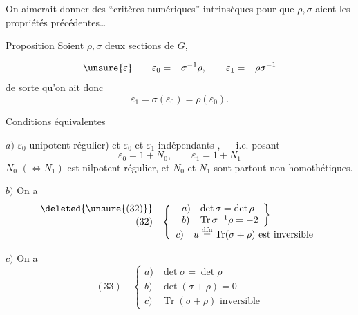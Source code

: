 On aimerait donner des ``critères numériques'' intrinsèques pour que $\rho,\sigma$ aient les propriétés précédentes\ldots

\uline{Proposition} Soient $\rho,\sigma$ deux sections  de $G$,

 
\[
\unsure{\varepsilon}\qquad \varepsilon_0=-\sigma^{-1}\rho,\qquad \varepsilon_1=-\rho\sigma^{-1}
\]
de sorte qu'on ait donc
\[
\varepsilon_1=\sigma(\varepsilon_0)=\rho(\varepsilon_0).
\]

Conditions équivalentes

$a)$  $\varepsilon_0$        unipotent régulier) et  $\varepsilon_0$ et $\varepsilon_1$   indépendants , --- i.e. posant
\[
\varepsilon_0=1+N_0,\qquad \varepsilon_1=1+N_1
\]
$N_0$ $(\Leftrightarrow N_1)$ est nilpotent régulier, et $N_0$ et $N_1$ sont partout non homothétiques.

$b)$ On a
\[
\begin{array}{rl}
\deleted{\unsure{(32)}}&\\[-1.2em]
(32)&\left\{\begin{array}{l}
\left.\begin{array}{ll}
a)&\det\sigma=\det\rho\\
b)&\operatorname{Tr}\sigma^{-1}\rho=-2
\end{array}\right\}\\
c)\quad u\overset{\mathrm{dfn}}{=}\operatorname{Tr}(\sigma+\rho)\text{ est inversible}
\end{array}\right.
\end{array}
\]
 

$c)$ On a \deleted{$\det\sigma=\det\rho$}
\[
(33)\quad\left\{\begin{array}{ll}
a)&\det\sigma=\det\rho\\
b)&\det(\sigma+\rho)=0\\
c)&\operatorname{Tr}(\sigma+\rho)\text{ inversible}
\end{array}\right.
\]

